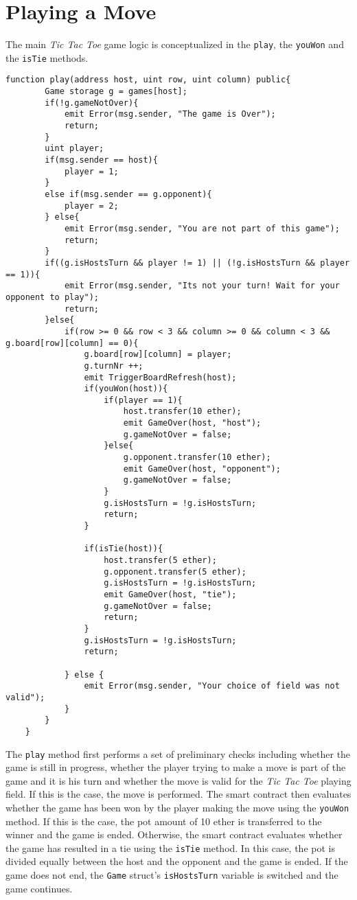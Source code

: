 \documentclass[10pt]{article}
\begin{document}
\section{Playing a Move}
The main \emph{Tic Tac Toe} game logic is conceptualized in the \texttt{play}, the \texttt{youWon} and the \texttt{isTie} methods.
\begin{Verbatim}[fontsize=\small]
    function play(address host, uint row, uint column) public{
        Game storage g = games[host];
        if(!g.gameNotOver){
            emit Error(msg.sender, "The game is Over");
            return;
        }
        uint player;
        if(msg.sender == host){
            player = 1;
        }
        else if(msg.sender == g.opponent){
            player = 2;
        } else{
            emit Error(msg.sender, "You are not part of this game");
            return;
        }
        if((g.isHostsTurn && player != 1) || (!g.isHostsTurn && player == 1)){
            emit Error(msg.sender, "Its not your turn! Wait for your opponent to play");
            return;
        }else{
            if(row >= 0 && row < 3 && column >= 0 && column < 3 && g.board[row][column] == 0){
                g.board[row][column] = player;
                g.turnNr ++;
                emit TriggerBoardRefresh(host);
                if(youWon(host)){
                    if(player == 1){
                        host.transfer(10 ether);
                        emit GameOver(host, "host");
                        g.gameNotOver = false;
                    }else{
                        g.opponent.transfer(10 ether);
                        emit GameOver(host, "opponent");
                        g.gameNotOver = false;
                    }
                    g.isHostsTurn = !g.isHostsTurn;
                    return;
                }

                if(isTie(host)){
                    host.transfer(5 ether);
                    g.opponent.transfer(5 ether);
                    g.isHostsTurn = !g.isHostsTurn;
                    emit GameOver(host, "tie");
                    g.gameNotOver = false;
                    return;
                }
                g.isHostsTurn = !g.isHostsTurn;
                return;

            } else {
                emit Error(msg.sender, "Your choice of field was not valid");
            }
        }
    }
\end{Verbatim}
The \texttt{play} method first performs a set of preliminary checks including whether the game is still in progress, whether the player trying to make a move is part of the game and it is his turn and whether the move is valid for the \emph{Tic Tac Toe} playing field. If this is the case, the move is performed. The smart contract then evaluates whether the game has been won by the player making the move using the \texttt{youWon} method. If this is the case, the pot amount of 10 ether is transferred to the winner and the game is ended. Otherwise, the smart contract evaluates whether the game has resulted in a tie using the \texttt{isTie} method. In this case, the pot is divided equally between the host and the opponent and the game is ended. If the game does not end, the \texttt{Game} struct's \texttt{isHostsTurn} variable is switched and the game continues.
\end{document}
